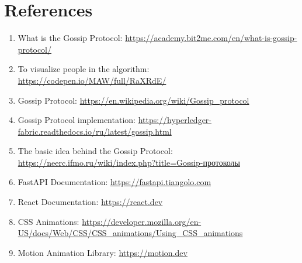 \documentclass[a4paper,12pt]{article}
\begin{document}
\section{References}

\begin{enumerate}
    \item What is the Gossip Protocol: \url{https://academy.bit2me.com/en/what-is-gossip-protocol/}
    \item To visualize people in the algorithm: \url{https://codepen.io/MAW/full/RaXRdE/}
    \item Gossip Protocol: \url{https://en.wikipedia.org/wiki/Gossip_protocol}
    \item Gossip Protocol implementation: \url{https://hyperledger-fabric.readthedocs.io/ru/latest/gossip.html}
    \item The basic idea behind the Gossip Protocol: \url{https://neerc.ifmo.ru/wiki/index.php?title=Gossip-протоколы}
    \item FastAPI Documentation: \url{https://fastapi.tiangolo.com}
    \item React Documentation: \url{https://react.dev}
    \item CSS Animations: \url{https://developer.mozilla.org/en-US/docs/Web/CSS/CSS_animations/Using_CSS_animations}
    \item Motion Animation Library: \url{https://motion.dev}
\end{enumerate}
\end{document}
